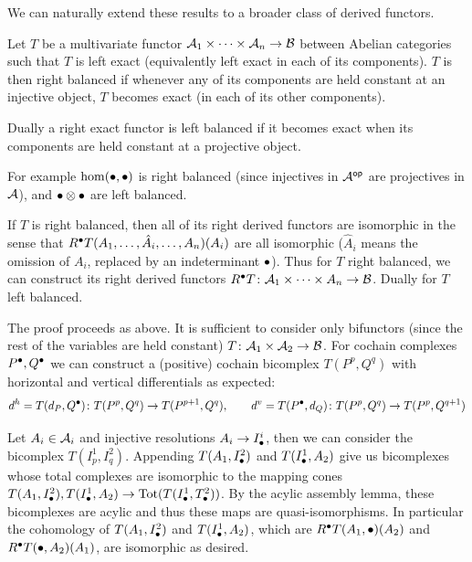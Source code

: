 \eproof

We can naturally extend these results to a broader class of derived functors.

\bdefn

    Let $T$ be a multivariate functor ${{\cal A}}_1\times\cdots\times{{\cal A}}_n\to{\cal B}$ between Abelian categories such that $T$ is left exact (equivalently left exact in each of
    its components).
    $T$ is then {\emphcolor right balanced} if whenever any of its components are held constant at an injective object, $T$ becomes exact (in each of its other components).

    Dually a right exact functor is {\emphcolor left balanced} if it becomes exact when its components are held constant at a projective object.

\edefn

For example $\hom(\bullet,\bullet)$ is right balanced (since injectives in ${{\cal A}}^{\sf op}$ are projectives in ${{\cal A}}$), and $\bullet\otimes\bullet$ are left balanced.

If $T$ is right balanced, then all of its right derived functors are isomorphic in the sense that $R^\bullet T(A_1,\dots,\hat A_i,\dots,A_n)(A_i)$ are all isomorphic ($\hat A_i$ means
the omission of $A_i$, replaced by an indeterminant $\bullet$).
Thus for $T$ right balanced, we can construct its {\emphcolor right derived functors} $R^\bullet T\colon{{\cal A}}_1\times\cdots\times A_n\to{\cal B}$.
Dually for $T$ left balanced.

The proof proceeds as above.
It is sufficient to consider only bifunctors (since the rest of the variables are held constant) $T\colon{{\cal A}}_1\times{{\cal A}}_2\to{\cal B}$.
For cochain complexes $P^\bullet,Q^\bullet$ we can construct a (positive) cochain bicomplex $T(P^p,Q^q)$ with horizontal and vertical differentials as expected:
$$ d^h=T(d_P,Q^\bullet)\colon T(P^p,Q^q)\to T(P^{p+1},Q^q),\qquad d^v=T(P^\bullet,d_Q)\colon T(P^p,Q^q)\to T(P^p,Q^{q+1}) $$

Let $A_i\in{{\cal A}}_i$ and injective resolutions $A_i\to I^i_\bullet$, then we can consider the bicomplex $T(I^1_p,I^2_q)$.
Appending $T(A_1,I^2_\bullet)$ and $T(I^1_\bullet,A_2)$ give us bicomplexes whose total complexes are isomorphic to the mapping cones $T(A_1,I^2_\bullet),T(I^1_\bullet,A_2)\to{\rm Tot}(T(I^1_\bullet,T^2_\bullet))$.
By the acylic assembly lemma, these bicomplexes are acylic and thus these maps are quasi-isomorphisms.
In particular the cohomology of $T(A_1,I^2_\bullet)$ and $T(I^1_\bullet,A_2)$, which are $R^\bullet T(A_1,\bullet)(A_2)$ and $R^\bullet T(\bullet,A_2)(A_1)$, are isomorphic as desired.

